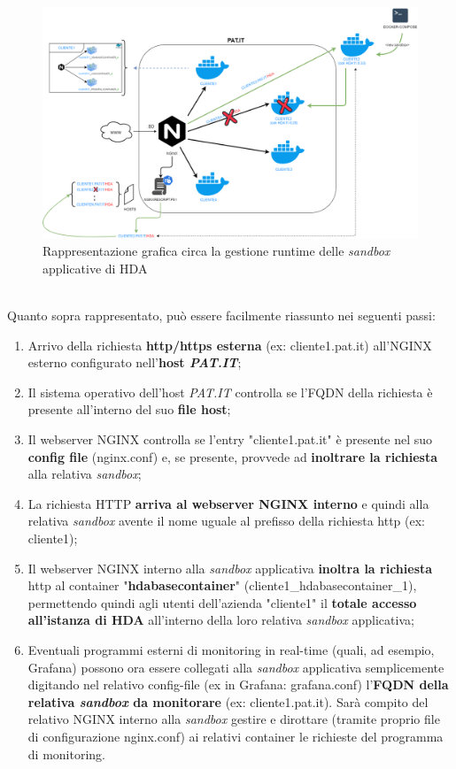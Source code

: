 \begin{figure}[!h]     
\centering 
    \includegraphics[width=1.0\columnwidth]{immagini/img/sandbox_nginx} 
    \caption{Rappresentazione grafica circa la gestione runtime delle \textit{sandbox} applicative di HDA}
\end{figure}\\
\newpage
Quanto sopra rappresentato, può essere facilmente riassunto nei seguenti passi:
\begin{enumerate}
	\item Arrivo della richiesta \textbf{http/https esterna} (ex: cliente1.pat.it) all'NGINX esterno configurato nell'\textbf{host \textit{PAT.IT}};
	\item Il sistema operativo dell'host \textit{PAT.IT} controlla se l'FQDN della richiesta è presente all'interno del suo \textbf{file host};%
	\item Il webserver NGINX controlla se l'entry "cliente1.pat.it" è presente nel suo \textbf{config file} (nginx.conf) e, se presente, provvede ad \textbf{inoltrare la richiesta} alla relativa \textit{sandbox};
	\item La richiesta HTTP \textbf{arriva al webserver NGINX interno} e quindi alla relativa \textit{sandbox} avente il nome uguale al prefisso della richiesta http (ex: cliente1);
    	\item Il webserver NGINX interno alla \textit{sandbox} applicativa \textbf{inoltra la richiesta} http al container "\textbf{hdabasecontainer}" (cliente1\_hdabasecontainer\_1), permettendo quindi agli utenti dell'azienda "cliente1" il \textbf{totale accesso all'istanza di HDA} all'interno della loro relativa \textit{sandbox} applicativa;
	\item Eventuali programmi esterni di monitoring in real-time (quali, ad esempio, Grafana) possono ora essere collegati alla \textit{sandbox} applicativa semplicemente digitando nel relativo config-file (ex in Grafana: grafana.conf) l'\textbf{FQDN della relativa \textit{sandbox} da monitorare} (ex: cliente1.pat.it). Sarà compito del relativo NGINX interno alla \textit{sandbox} gestire e dirottare (tramite proprio file di configurazione nginx.conf) ai relativi container le richieste del programma di monitoring.\\
\end{enumerate}

